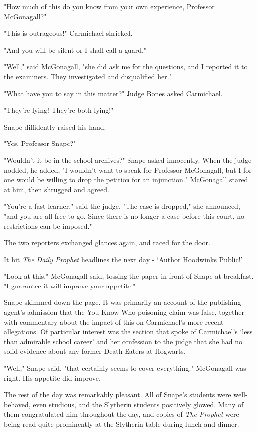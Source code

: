 \documentclass[a4paper,11pt]{article}
\begin{document}
"How much of this do you know from your own experience, Professor McGonagall?"

"This is outrageous!" Carmichael shrieked.

"And you will be silent or I shall call a guard."

"Well," said McGonagall, "she did ask me for the questions, and I reported it to the examiners. They investigated and disqualified her."

"What have you to say in this matter?" Judge Bones asked Carmichael.

"They're lying! They're both lying!"

Snape diffidently raised his hand.

"Yes, Professor Snape?"

"Wouldn't it be in the school archives?" Snape asked innocently. When the judge nodded, he added, "I wouldn't want to speak for Professor McGonagall, but I for one would be willing to drop the petition for an injunction." McGonagall stared at him, then shrugged and agreed.

"You're a fast learner," said the judge. "The case is dropped," she announced, "and you are all free to go. Since there is no longer a case before this court, no restrictions can be imposed."

The two reporters exchanged glances again, and raced for the door.

It hit \emph{The Daily Prophet} headlines the next day - `Author Hoodwinks Public!'

"Look at this," McGonagall said, tossing the paper in front of Snape at breakfast. "I guarantee it will improve your appetite."

Snape skimmed down the page. It was primarily an account of the publishing agent's admission that the You-Know-Who poisoning claim was false, together with commentary about the impact of this on Carmichael's more recent allegations. Of particular interest was the section that spoke of Carmichael's `less than admirable school career' and her confession to the judge that she had no solid evidence about any former Death Eaters at Hogwarts.

"Well," Snape said, "that certainly seems to cover everything." McGonagall was right. His appetite did improve.

The rest of the day was remarkably pleasant. All of Snape's students were well-behaved, even studious, and the Slytherin students positively glowed. Many of them congratulated him throughout the day, and copies of \emph{The Prophet} were being read quite prominently at the Slytherin table during lunch and dinner.
\end{document}
